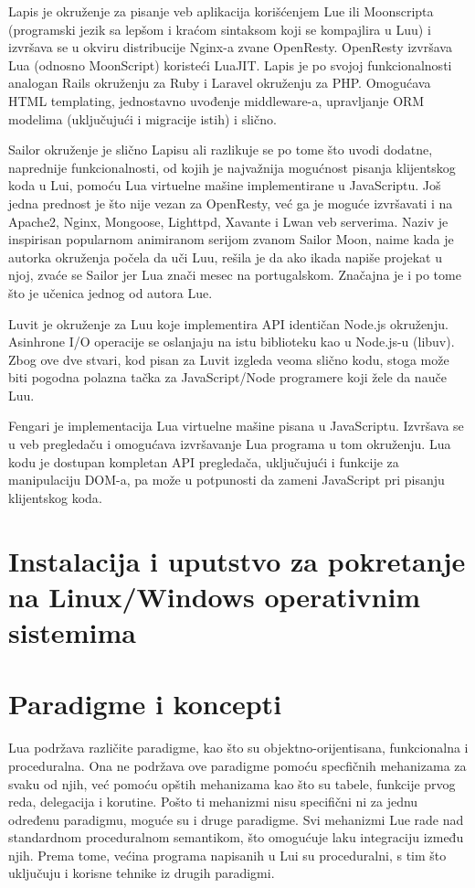 \documentclass[a4paper]{article}
\begin{document}
Lapis je okruženje za pisanje veb aplikacija korišćenjem Lue ili Moonscripta (programski jezik sa lepšom i kraćom sintaksom koji se kompajlira u Luu) i izvršava se u okviru distribucije Nginx-a zvane OpenResty. OpenResty izvršava Lua (odnosno MoonScript) koristeći LuaJIT. Lapis je po svojoj funkcionalnosti analogan Rails okruženju za Ruby i Laravel okruženju za PHP. Omogućava HTML templating, jednostavno uvođenje middleware-a, upravljanje ORM modelima (uključujući i migracije istih) i slično. 

Sailor okruženje je slično Lapisu ali razlikuje se po tome što uvodi dodatne, naprednije funkcionalnosti, od kojih je najvažnija mogućnost pisanja klijentskog koda u Lui, pomoću Lua virtuelne mašine implementirane u JavaScriptu. Još jedna prednost je što nije vezan za OpenResty, već ga je moguće izvršavati i na Apache2, Nginx, Mongoose, Lighttpd, Xavante i Lwan veb serverima. Naziv je inspirisan popularnom animiranom serijom zvanom Sailor Moon, naime kada je autorka okruženja počela da uči Luu, rešila je da ako ikada napiše projekat u njoj, zvaće se Sailor jer Lua znači mesec na portugalskom. Značajna je i po tome što je učenica jednog od autora Lue\cite{frameworkSailor}.

Luvit je okruženje za Luu koje implementira API identičan Node.js okruženju. Asinhrone I/O operacije se oslanjaju na istu biblioteku kao u Node.js-u (libuv). Zbog ove dve stvari, kod pisan za Luvit izgleda veoma slično kodu, stoga može biti pogodna polazna tačka za JavaScript/Node programere koji žele da nauče Luu.

Fengari je implementacija Lua virtuelne mašine pisana u JavaScriptu. Izvršava se u veb pregledaču i omogućava izvršavanje Lua programa u tom okruženju. Lua kodu je dostupan kompletan API pregledača, uključujući i funkcije za manipulaciju DOM-a, pa može u potpunosti da zameni JavaScript pri pisanju klijentskog koda\cite{frameworkFengari}.


\section{Instalacija i uputstvo za pokretanje na Linux/Windows operativnim sistemima}
\label{sec:instalacija}


\section{Paradigme i koncepti}
\label{sec:paradigme_koncepti}

Lua podržava različite paradigme, kao što su objektno-orijentisana, funkcionalna i proceduralna. Ona ne podržava ove paradigme pomoću specfičnih mehanizama za svaku od njih, već pomoću opštih mehanizama kao što su tabele, funkcije prvog reda, delegacija i korutine. Pošto ti mehanizmi nisu specifični ni za jednu određenu paradigmu, moguće su i druge paradigme. Svi mehanizmi Lue rade nad standardnom proceduralnom semantikom, što omogućuje laku integraciju između njih. Prema tome, većina programa napisanih u Lui su proceduralni, s tim što uključuju i korisne tehnike iz drugih paradigmi. \cite{multiParadigms}
\end{document}
